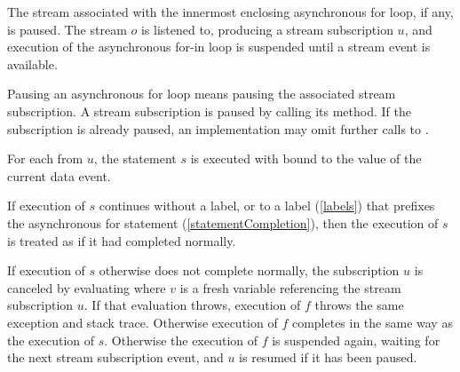 \documentclass[makeidx]{article}
\begin{document}
{\LMHash{}%
The stream associated with the innermost enclosing asynchronous for loop,
if any, is paused.
The stream $o$ is listened to, producing a stream subscription $u$,
and execution of the asynchronous for-in loop is suspended
until a stream event is available.

Pausing an asynchronous for loop means pausing
the associated stream subscription.
A stream subscription is paused by calling its  method.
If the subscription is already paused, an implementation may omit
further calls to .


\LMHash{}%
For each  from $u$,
the statement $s$ is executed with \id{} bound to
the value of the current data event.


\LMHash{}%
If execution of $s$ continues without a label,
or to a label (\ref{labels})
that prefixes the asynchronous for statement (\ref{statementCompletion}),
then the execution of $s$ is treated as if it had completed normally.

\LMHash{}%
If execution of $s$ otherwise does not complete normally,
the subscription $u$ is canceled by evaluating 
where $v$ is a fresh variable referencing the stream subscription $u$.
If that evaluation throws,
execution of $f$ throws the same exception and stack trace.
Otherwise execution of $f$ completes in the same way as the execution of $s$.
Otherwise the execution of $f$ is suspended again, waiting for
the next stream subscription event,
and $u$ is resumed if it has been paused.

}
\end{document}
